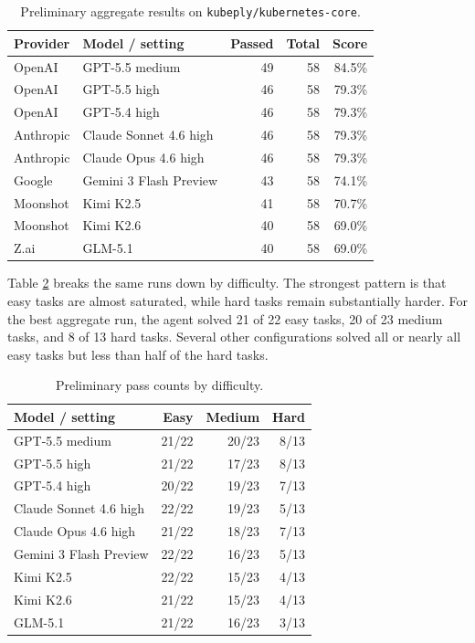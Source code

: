 \documentclass[11pt]{article}
\begin{document}
\begin{table}[h]
\centering
\begin{tabular}{llrrr}
\toprule
Provider & Model / setting & Passed & Total & Score \\
\midrule
OpenAI & GPT-5.5 medium & 49 & 58 & 84.5\% \\
OpenAI & GPT-5.5 high & 46 & 58 & 79.3\% \\
OpenAI & GPT-5.4 high & 46 & 58 & 79.3\% \\
Anthropic & Claude Sonnet 4.6 high & 46 & 58 & 79.3\% \\
Anthropic & Claude Opus 4.6 high & 46 & 58 & 79.3\% \\
Google & Gemini 3 Flash Preview & 43 & 58 & 74.1\% \\
Moonshot & Kimi K2.5 & 41 & 58 & 70.7\% \\
Moonshot & Kimi K2.6 & 40 & 58 & 69.0\% \\
Z.ai & GLM-5.1 & 40 & 58 & 69.0\% \\
\bottomrule
\end{tabular}
\caption{Preliminary aggregate results on \texttt{kubeply/kubernetes-core}.}
\label{tab:model-results}
\end{table}

Table \ref{tab:difficulty-results} breaks the same runs down by difficulty.
The strongest pattern is that easy tasks are almost saturated, while hard tasks
remain substantially harder. For the best aggregate run, the agent solved 21 of
22 easy tasks, 20 of 23 medium tasks, and 8 of 13 hard tasks. Several other
configurations solved all or nearly all easy tasks but less than half of the
hard tasks.

\begin{table}[h]
\centering
\begin{tabular}{lrrr}
\toprule
Model / setting & Easy & Medium & Hard \\
\midrule
GPT-5.5 medium & 21/22 & 20/23 & 8/13 \\
GPT-5.5 high & 21/22 & 17/23 & 8/13 \\
GPT-5.4 high & 20/22 & 19/23 & 7/13 \\
Claude Sonnet 4.6 high & 22/22 & 19/23 & 5/13 \\
Claude Opus 4.6 high & 21/22 & 18/23 & 7/13 \\
Gemini 3 Flash Preview & 22/22 & 16/23 & 5/13 \\
Kimi K2.5 & 22/22 & 15/23 & 4/13 \\
Kimi K2.6 & 21/22 & 15/23 & 4/13 \\
GLM-5.1 & 21/22 & 16/23 & 3/13 \\
\bottomrule
\end{tabular}
\caption{Preliminary pass counts by difficulty.}
\label{tab:difficulty-results}
\end{table}
\end{document}

